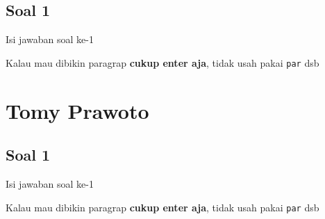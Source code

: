\subsection{Soal 1}
Isi jawaban soal ke-1

Kalau mau dibikin paragrap \textbf{cukup enter aja}, tidak usah pakai \verb|par| dsb



\section{Tomy Prawoto}
\subsection{Soal 1}
Isi jawaban soal ke-1

Kalau mau dibikin paragrap \textbf{cukup enter aja}, tidak usah pakai \verb|par| dsb


